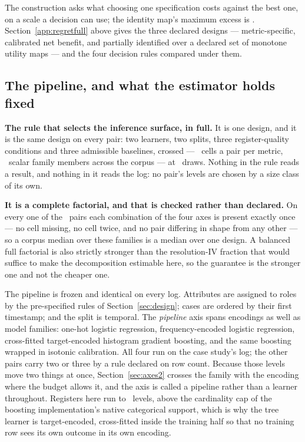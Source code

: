 The construction asks what choosing one specification costs against the best
one, on a scale a decision can use; the identity map's maximum excess is
\identityMaxExcess. Section~\ref{app:regretfull} above gives the three declared
designs --- metric-specific, calibrated net benefit, and partially identified
over a declared set of monotone utility maps --- and the four decision rules
compared under them.

\subsection{The pipeline, and what the estimator holds fixed}
\label{app:pipeline}


\textbf{The rule that selects the inference surface, in full.} It is one
design, and it is the
same design on every pair: two learners, two splits, three register-quality
conditions and three admissible baselines, crossed --- \nCellsPerDecomposition\ cells a pair
per metric,
\nInferenceScalar\ scalar family members across the corpus --- at
\nDrawsSurface\ draws. Nothing in the rule reads a result, and nothing in it
reads the log: no pair's levels are chosen by a size class of its own.

\textbf{It is a complete factorial, and that is checked rather than
declared.} On every one of the \nPairs\ pairs each combination of the four
axes is present exactly once --- no cell missing, no cell twice, and no pair
differing in shape from any other --- so a corpus median over these families
is a median over one design. A balanced
full factorial is also strictly stronger than the resolution-IV fraction that
would suffice to make the decomposition estimable here, so the guarantee is the
stronger one and not the cheaper one.



The pipeline is frozen and identical on every log. Attributes are assigned to
roles by the pre-specified rules of Section~\ref{sec:design}; cases are
ordered by their first timestamp; and the split is temporal. The
\emph{pipeline} axis spans encodings as well as model families: one-hot
logistic regression, frequency-encoded logistic regression, cross-fitted
target-encoded \citep{micci2001preprocessing} histogram gradient boosting, and
the same boosting wrapped in isotonic calibration. All four run on the case
study's log; the other pairs carry two or three by a rule declared on row
count. Because those levels move two things at once,
Section~\ref{sec:axes2} crosses the family with the encoding where the budget
allows it, and the axis is called a pipeline rather than a learner throughout.
Registers here run to \cardFMax\ levels, above the cardinality cap of the
boosting implementation's native categorical support, which is why the tree
learner is target-encoded, cross-fitted inside the training half so that no
training row sees its own outcome in its own encoding.

